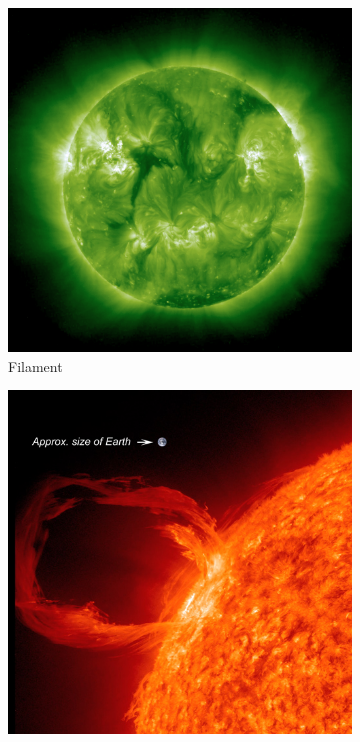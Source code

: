 \begin{figure}
     \begin{subfigure}[b]{0.5\textwidth}
         \centering
         \includegraphics[width=\textwidth]{images/195_Filament.png}
         \caption{Filament}
         \label{fig:filament}
     \end{subfigure}
     \hfill
     \begin{subfigure}[b]{0.5\textwidth}
         \centering
         \includegraphics[width=\textwidth]{images/prominence.jpg}

\end{subfigure}
\end{figure}
